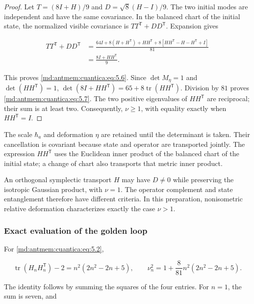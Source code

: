 \begin{proof}
Let \(T=(8I+H)/9\) and \(D=\sqrt8(H-I)/9\). The two initial modes are independent and have the same covariance. In the balanced chart of the initial state, the normalized visible covariance is \(TT^{\mathsf T}+DD^{\mathsf T}\). Expansion gives

\[
\begin{aligned}
TT^{\mathsf T}+DD^{\mathsf T}
&=\frac{64I+8(H+H^{\mathsf T})+HH^{\mathsf T}
+8[HH^{\mathsf T}-H-H^{\mathsf T}+I]}{81}\\
&=\frac{8I+HH^{\mathsf T}}9.
\end{aligned}
\]

This proves \eqref{md:antmem:cuantica:eq:5.6}. Since \(\det M_\eta=1\) and \(\det(HH^{\mathsf T})=1\),
\(\det(8I+HH^{\mathsf T})=65+8\operatorname{tr}(HH^{\mathsf T})\).
Division by \(81\) proves \eqref{md:antmem:cuantica:eq:5.7}. The two positive eigenvalues of \(HH^{\mathsf T}\) are reciprocal; their sum is at least two. Consequently, \(\nu\geq1\), with equality exactly when \(HH^{\mathsf T}=I\).
\end{proof}

The scale \(\hbar_a\) and deformation \(\eta\) are retained until the determinant is taken. Their cancellation is covariant because state and operator are transported jointly. The expression \(HH^{\mathsf T}\) uses the Euclidean inner product of the balanced chart of the initial state; a change of chart also transports that metric inner product.

An orthogonal symplectic transport \(H\) may have \(D\neq0\) while preserving the isotropic Gaussian product, with \(\nu=1\). The operator complement and state entanglement therefore have different criteria. In this preparation, nonisometric relative deformation characterizes exactly the case \(\nu>1\).

\subsubsection{Exact evaluation of the golden loop}

For \eqref{md:antmem:cuantica:eq:5.2},

\begin{equation}
\operatorname{tr}(H_nH_n^{\mathsf T})-2
=n^2(2n^2-2n+5),\qquad
\nu_n^2=1+\frac8{81}n^2(2n^2-2n+5).
\label{md:antmem:cuantica:eq:5.8}
\end{equation}

The identity follows by summing the squares of the four entries. For \(n=1\), the sum is seven, and

